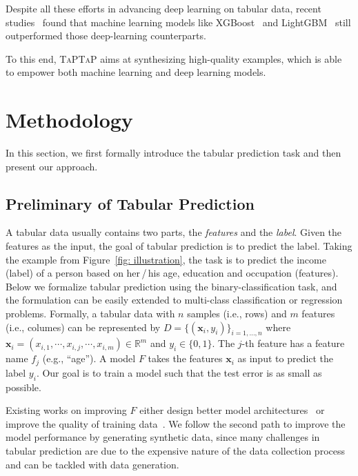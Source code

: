 Despite all these efforts in advancing deep learning on tabular data, recent studies~\citep{deeplearning-not,revisiting,why-do-tree} found that machine learning models like XGBoost~\citep{xgboost} and LightGBM~\citep{lightgbm} still outperformed those deep-learning counterparts.

To this end, \textsc{TaPTaP} aims at synthesizing high-quality examples, which is able to empower both machine learning and deep learning models.

\section{Methodology}

In this section, we first formally introduce the tabular prediction task and then present our approach.

\subsection{Preliminary of Tabular Prediction}

A tabular data usually contains two parts, the \textit{features} and the \textit{label}. 
Given the features as the input, the goal of tabular prediction is to predict the label. Taking the example from Figure~\ref{fig: illustration}, the task is to predict the income (label) of a person based on her\,/\,his age, education and occupation (features). Below we formalize tabular prediction using the binary-classification task, and the formulation can be easily extended to multi-class classification or regression problems. Formally, a tabular data with $n$ samples (i.e., rows) and $m$ features (i.e., columes) can be represented by $D\!=\!\!\{(\mathbf{x}_i,y_i)\}_{i=1,\ldots, n}$ where 
$\mathbf{x}_i\!\!=\!\!(x_{i,1},\cdots,x_{i,j},\cdots,x_{i,m})\in \mathbb{R}^m$ and
$y_i\in \{0,1\}$. The $j$-th feature has a feature name $f_j$ (e.g., ``age''). A model $F$ takes the features $\mathbf{x}_i$ as input to predict the label $y_i$. Our goal is to train a model such that the test error is as small as possible.

Existing works on improving $F$ either design better model architectures~\cite{revisiting} or improve the quality of training data~\citep{DBLP:journals/corr/OpenFE}. We follow the second path to improve the model performance by generating synthetic data, since many challenges in tabular prediction are due to the expensive nature of the data collection process and can be tackled with data generation.

